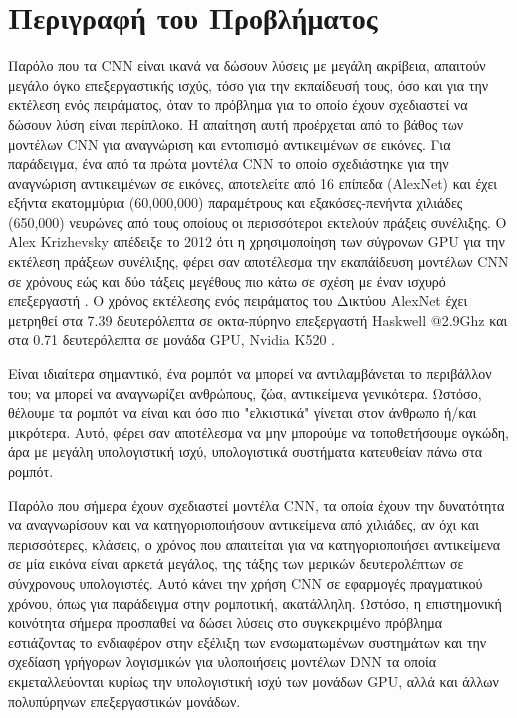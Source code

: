 \section{Περιγραφή του Προβλήματος}
\label{section:problem_description}

Παρόλο που τα CΝΝ είναι ικανά να δώσουν λύσεις με μεγάλη ακρίβεια, απαιτούν
μεγάλο όγκο επεξεργαστικής ισχύς, τόσο για την εκπαίδευσή τους, όσο και για την
εκτέλεση ενός πειράματος, όταν το πρόβλημα για το οποίο έχουν
σχεδιαστεί να δώσουν λύση είναι περίπλοκο. Η απαίτηση αυτή προέρχεται από το βάθος
των μοντέλων CNN για αναγνώριση και εντοπισμό αντικειμένων σε εικόνες.
Για παράδειγμα, ένα από τα πρώτα μοντέλα CNN το οποίο σχεδιάστηκε για την
αναγνώριση αντικειμένων σε εικόνες, αποτελείτε από 16 επίπεδα (AlexNet)
και έχει εξήντα εκατομμύρια (60,000,000) παραμέτρους και
εξακόσες-πενήντα χιλιάδες (650,000) νευρώνες από τους οποίους οι περισσότεροι
εκτελούν πράξεις συνέλιξης. Ο Alex Krizhevsky απέδειξε το 2012 ότι η χρησιμοποίηση
των σύγρονων GPU για την εκτέλεση πράξεων συνέλιξης, φέρει σαν αποτέλεσμα την
εκαπάίδευση μοντέλων CNN σε χρόνους εώς και δύο τάξεις μεγέθους πιο κάτω σε σχέση
με έναν ισχυρό επεξεργαστή \cite{NIPS2012_4824}. Ο χρόνος εκτέλεσης ενός πειράματος του Δικτύου AlexNet
έχει μετρηθεί στα 7.39 δευτερόλεπτα σε οκτα-πύρηνο επεξεργαστή Haskwell @2.9Ghz
και στα 0.71 δευτερόλεπτα σε μονάδα GPU, Nvidia K520 \cite{abuzaidoptimizing}.

Είναι ιδιαίτερα σημαντικό, ένα ρομπότ να μπορεί να αντιλαμβάνεται το περιβάλλον
του; να μπορεί να αναγνωρίζει ανθρώπους, ζώα, αντικείμενα γενικότερα. Ωστόσο,
θέλουμε τα ρομπότ να είναι και όσο πιο "ελκιστικά" γίνεται στον άνθρωπο ή/και μικρότερα.
Αυτό, φέρει σαν αποτέλεσμα να μην μπορούμε να τοποθετήσουμε ογκώδη, άρα με μεγάλη
υπολογιστική ισχύ, υπολογιστικά συστήματα κατευθείαν πάνω στα ρομπότ.

Παρόλο που σήμερα έχουν σχεδιαστεί μοντέλα CNN, τα οποία έχουν την δυνατότητα να
αναγνωρίσουν και να κατηγοριοποιήσουν αντικείμενα από χιλιάδες, αν όχι και περισσότερες,
κλάσεις, ο χρόνος που απαιτείται για να κατηγοριοποιήσει αντικείμενα σε μία εικόνα
είναι αρκετά μεγάλος, της τάξης των μερικών δευτερολέπτων σε σύνχρονους υπολογιστές.
Αυτό κάνει την χρήση CNN σε εφαρμογές πραγματικού χρόνου, όπως για παράδειγμα
στην ρομποτική, ακατάλληλη.
Ωστόσο, η επιστημονική κοινότητα σήμερα προσπαθεί να δώσει λύσεις στο συγκεκριμένο
πρόβλημα εστιάζοντας το ενδιαφέρον στην εξέλιξη των ενσωματωμένων συστημάτων
και την σχεδίαση γρήγορων λογισμικών για υλοποιήσεις μοντέλων DNN τα οποία
εκμεταλλεύονται κυρίως την υπολογιστική ισχύ των μονάδων GPU, αλλά και άλλων
πολυπύρηνων επεξεργαστικών μονάδων.
